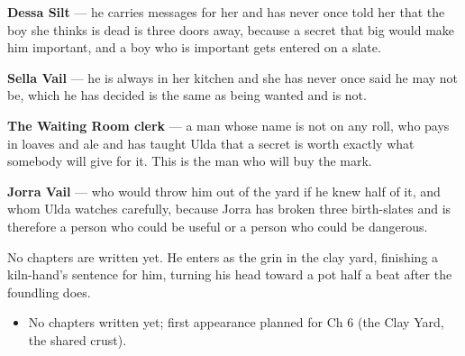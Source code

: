 \documentclass{design/chronicle}
\begin{document}
{\textbf{Dessa Silt} — he carries messages for her and has never once told her that the boy she thinks is dead is three doors away, because a secret that big would make him important, and a boy who is important gets entered on a slate.

\textbf{Sella Vail} — he is always in her kitchen and she has never once said he may not be, which he has decided is the same as being wanted and is not.

\textbf{The Waiting Room clerk} — a man whose name is not on any roll, who pays in loaves and ale and has taught Ulda that a secret is worth exactly what somebody will give for it. This is the man who will buy the mark.

\textbf{Jorra Vail} — who would throw him out of the yard if he knew half of it, and whom Ulda watches carefully, because Jorra has broken three birth-slates and is therefore a person who could be useful or a person who could be dangerous.

No chapters are written yet. He enters as the grin in the clay yard, finishing a kiln-hand’s sentence for him, turning his head toward a pot half a beat after the foundling does.

\begin{itemize}[leftmargin=1.4em,itemsep=1pt,topsep=3pt,parsep=0pt]

\item No chapters written yet; first appearance planned for Ch 6 (the Clay Yard, the shared crust).

\end{itemize}
}
\end{document}
